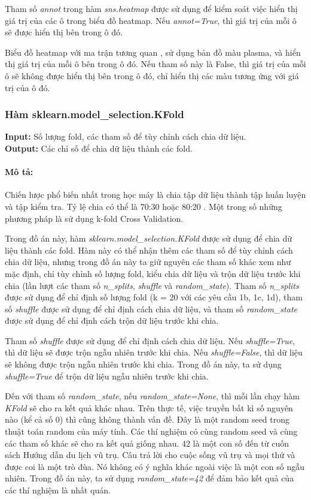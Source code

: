 \documentclass[]{article}
\begin{document}
Tham số \textit{annot} trong hàm \textit{sns.heatmap} được sử dụng để kiểm soát việc hiển thị giá trị của các ô trong biểu đồ heatmap. Nếu \textit{annot=True}, thì giá trị của mỗi ô sẽ được hiển thị bên trong ô đó.

Biểu đồ heatmap với ma trận tương quan , sử dụng bản đồ màu plasma, và hiển thị giá trị của mỗi ô bên trong ô đó. Nếu tham số này là False, thì giá trị của mỗi ô sẽ không được hiển thị bên trong ô đó, chỉ hiển thị các màu tương ứng với giá trị của ô đó.

\subsubsection{Hàm sklearn.model\_selection.KFold}
\noindent
\textbf{Input:} Số lượng fold, các tham số để tùy chỉnh cách chia dữ liệu. \\
\textbf{Output:} Các chỉ số để chia dữ liệu thành các fold.
\paragraph{Mô tả:} 
Chiến lược phổ biến nhất trong học máy là chia tập dữ liệu thành tập huấn luyện và tập kiểm tra. Tỷ lệ chia có thể là 70:30 hoặc 80:20 \cite{r1}. Một trong số những phương pháp là sử dụng k-fold Cross Validation. \cite{mediumCrossValidationUsing}

Trong đồ án này, hàm \textit{sklearn.model\_selection.KFold} \cite{scikitlearnSklearnmodel} được sử dụng để chia dữ liệu thành các fold. Hàm này có thể nhận thêm các tham số để tùy chỉnh cách chia dữ liệu, nhưng trong đồ án này ta giữ nguyên các tham số khác xem như mặc định, chỉ tùy chỉnh số lượng fold, kiểu chia dữ liệu và trộn dữ liệu trước khi chia (lần lượt các tham số \textit{n\_splits}, \textit{shuffle} và \textit{random\_state}). Tham số \textit{n\_splits} được sử dụng để chỉ định số lượng fold (k = 20 với các yêu cầu 1b, 1c, 1d), tham số \textit{shuffle} được sử dụng để chỉ định cách chia dữ liệu, và tham số \textit{random\_state} được sử dụng để chỉ định cách trộn dữ liệu trước khi chia.

Tham số \textit{shuffle} được sử dụng để chỉ định cách chia dữ liệu. Nếu \textit{shuffle=True}, thì dữ liệu sẽ được trộn ngẫu nhiên trước khi chia. Nếu \textit{shuffle=False}, thì dữ liệu sẽ không được trộn ngẫu nhiên trước khi chia. Trong đồ án này, ta sử dụng \textit{shuffle=True} để trộn dữ liệu ngẫu nhiên trước khi chia.

Đến với tham số \textit{random\_state}, nếu \textit{random\_state=None}, thì mỗi lần chạy hàm \textit{KFold} sẽ cho ra kết quả khác nhau. Trên thực tế, việc truyền bất kì số nguyên nào (kể cả số 0) thì cũng không thành vấn đề. Đây là một random seed trong thuật toán random của máy tính. \cite{wikipediaRandomSeed} Các thí nghiệm có cùng random seed và cùng các tham số khác sẽ cho ra kết quả giống nhau. 42 là một con số đến từ cuốn sách Hướng dẫn du lịch vũ trụ. Câu trả lời cho cuộc sống vũ trụ và mọi thứ và được coi là một trò đùa. Nó không có ý nghĩa khác ngoài việc là một con số ngẫu nhiên. \cite{stackoverflowRandomState} Trong đồ án này, ta sử dụng \textit{random\_state=42} để đảm bảo kết quả của các thí nghiệm là nhất quán.
\end{document}

